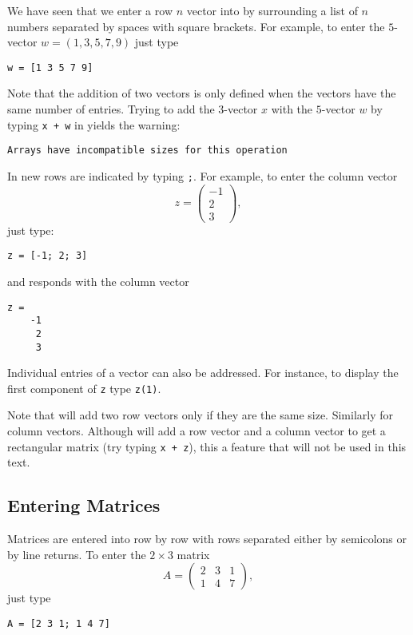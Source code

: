\documentclass{ximera}
\begin{document}
We have seen that we enter a row $n$ vector into \Matlab by
surrounding a list of $n$ numbers separated by spaces with
square brackets.  For example, to enter the $5$-vector
$w=(1,3,5,7,9)$ just type
\begin{verbatim}
w = [1 3 5 7 9]
\end{verbatim}
Note that the addition of two vectors is only defined when the
vectors have the same number of entries.  Trying to add the
$3$-vector $x$ with the $5$-vector $w$ by typing {\tt x + w} in \Matlab
yields the warning:
\begin{verbatim}
Arrays have incompatible sizes for this operation
\end{verbatim}

In \Matlab new rows are indicated by typing {\tt ;}. For
example, to enter the column vector
\[
z=\left(\begin{array}{r} -1 \\ 2\\ 3 \end{array}\right),
\]
just type:
\begin{verbatim}
z = [-1; 2; 3]
\end{verbatim}
\index{\computer![1; 2; 3]} and \Matlab responds with the column vector 
\begin{verbatim}
z =
    -1
     2
     3
\end{verbatim}
Individual entries of a vector can also be addressed.  For instance,
to display the first component of {\tt z} type {\tt z(1)}.

Note that \Matlab will add two row vectors only if they are the same size.  
Similarly for column vectors. Although \Matlab will add a row vector and 
a column vector to get a rectangular matrix (try typing {\tt x + z}), this a 
feature that will not be used in this text.

\subsection*{Entering Matrices}

Matrices are entered into \Matlab row by row with
rows separated either by semicolons or by line returns.  To enter
the $2\times 3$ matrix
\[
A=\left(\begin{array}{ccc} 2 & 3 & 1 \\ 1 & 4 & 7
\end{array}\right),
\]
just type
\begin{verbatim}
A = [2 3 1; 1 4 7]
\end{verbatim}
\end{document}
